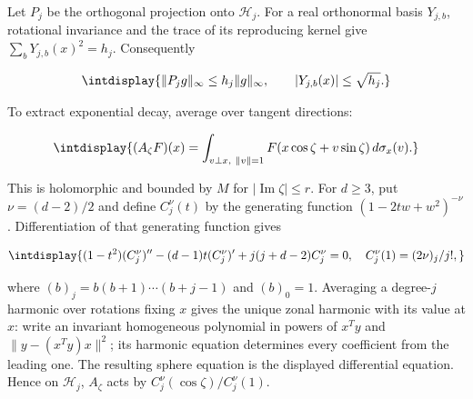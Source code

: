 
Let \(P_j\) be the orthogonal projection onto \(\mathcal H_j\). For a real orthonormal basis \(Y_{j,\allowbreak b}\), rotational invariance and the trace of its reproducing kernel give \(\sum_bY_{j,\allowbreak b}(x)^2=h_j\). Consequently


\begingroup\renewcommand{\theHequation}{intdisplay.553}
\begin{equation}
\intdisplay{
\|P_jg\|_\infty\le h_j\|g\|_\infty,\qquad
|Y_{j,b}(x)|\le\sqrt{h_j}.
}
\label{int:eq-0231-harmonic-projector-bounds}
\end{equation}
\endgroup


To extract exponential decay, average over tangent directions:


\begingroup\renewcommand{\theHequation}{intdisplay.554}
\begin{equation*}
\intdisplay{
(A_\zeta F)(x)=\int_{v\perp x,\ \|v\|=1}
            F(x\cos\zeta+v\sin\zeta)\,d\sigma_x(v).
}
\end{equation*}
\endgroup


This is holomorphic and bounded by \(M\) for \(|\operatorname{Im}\zeta|\le r\). For \(d\ge3\), put \(\nu=(d-2)/2\) and define \(C_j^\nu(t)\) by the generating function \((1-2tw+w^2)^{-\nu}\). Differentiation of that generating function gives


\begingroup\renewcommand{\theHequation}{intdisplay.555}
\begin{equation*}
\intdisplay{
(1-t^2)(C_j^\nu)''-(d-1)t(C_j^\nu)'
                +j(j+d-2)C_j^\nu=0,
\quad C_j^\nu(1)=(2\nu)_j/j!,
}
\end{equation*}
\endgroup


where \((b)_j=b(b+1)\cdots(b+j-1)\) and \((b)_0=1\). Averaging a degree-\(j\) harmonic over rotations fixing \(x\) gives the unique zonal harmonic with its value at \(x\): write an invariant homogeneous polynomial in powers of \(x^Ty\) and \(\|y-(x^Ty)x\|^2\); its harmonic equation determines every coefficient from the leading one. The resulting sphere equation is the displayed differential equation. Hence on \(\mathcal H_j\), \(A_\zeta\) acts by \(C_j^\nu(\cos\zeta)/C_j^\nu(1)\).



